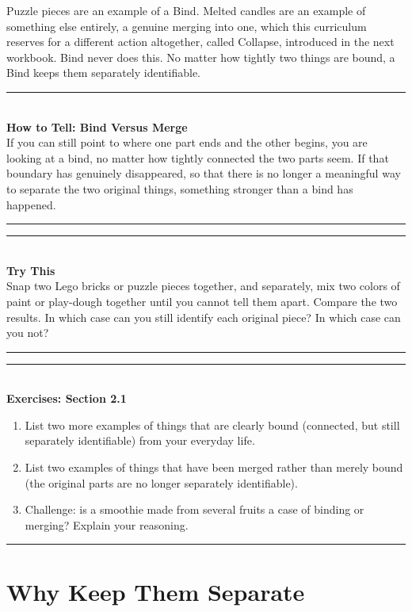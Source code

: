 \documentclass[11pt]{book}
\newenvironment{algorithmproc}[1]{\vspace{0.6em}\noindent\rule{\linewidth}{0.6pt}\\[0.2em]\textbf{How to Tell: #1}\\[0.3em]}{\\[0.2em]\noindent\rule{\linewidth}{0.6pt}\vspace{0.6em}}
\newenvironment{exercisebox}[1]{\vspace{0.8em}\noindent\rule{\linewidth}{0.6pt}\\[0.2em]\textbf{Exercises: #1}\\[0.3em]\begin{enumerate}[label=\arabic*., itemsep=0.4em]}{\end{enumerate}\noindent\rule{\linewidth}{0.6pt}\vspace{0.6em}}
\newenvironment{trythis}{\vspace{0.6em}\noindent\rule{\linewidth}{0.6pt}\\[0.2em]\textbf{Try This}\\[0.3em]}{\\[0.2em]\noindent\rule{\linewidth}{0.6pt}\vspace{0.6em}}
\begin{document}
\begin{center}
\end{center}

Puzzle pieces are an example of a Bind. Melted candles are an example of something else entirely, a genuine merging into one, which this curriculum reserves for a different action altogether, called Collapse, introduced in the next workbook. Bind never does this. No matter how tightly two things are bound, a Bind keeps them separately identifiable.

\begin{algorithmproc}{Bind Versus Merge}
If you can still point to where one part ends and the other begins, you are looking at a bind, no matter how tightly connected the two parts seem. If that boundary has genuinely disappeared, so that there is no longer a meaningful way to separate the two original things, something stronger than a bind has happened.
\end{algorithmproc}

\begin{trythis}
Snap two Lego bricks or puzzle pieces together, and separately, mix two colors of paint or play-dough together until you cannot tell them apart. Compare the two results. In which case can you still identify each original piece? In which case can you not?
\end{trythis}

\begin{exercisebox}{Section 2.1}
\item List two more examples of things that are clearly bound (connected, but still separately identifiable) from your everyday life.
\item List two examples of things that have been merged rather than merely bound (the original parts are no longer separately identifiable).
\item Challenge: is a smoothie made from several fruits a case of binding or merging? Explain your reasoning.
\end{exercisebox}

\chapter{Why Keep Them Separate}
\end{document}
